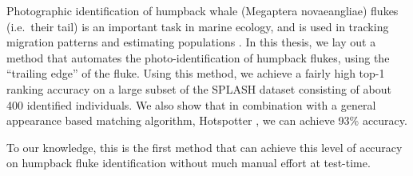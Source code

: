  

Photographic identification of humpback whale (Megaptera novaeangliae) flukes (i.e.\ their tail) is an important task in marine ecology, and is used in tracking migration patterns and estimating populations \cite{blackmer2000temporal} \cite{calambokidis2008splash}.
In this thesis, we lay out a method that automates the photo-identification of humpback flukes, using the ``trailing edge'' of the fluke.
Using this method, we achieve a fairly high top-1 ranking accuracy on a large subset of the SPLASH \cite{calambokidis2008splash} dataset consisting of about 400 identified individuals.
We also show that in combination with a general appearance based matching algorithm, Hotspotter \cite{crall_hotspotter_2013}, we can achieve 93\% accuracy.

To our knowledge, this is the first method that can achieve this level of accuracy on humpback fluke identification without much manual effort at test-time.





